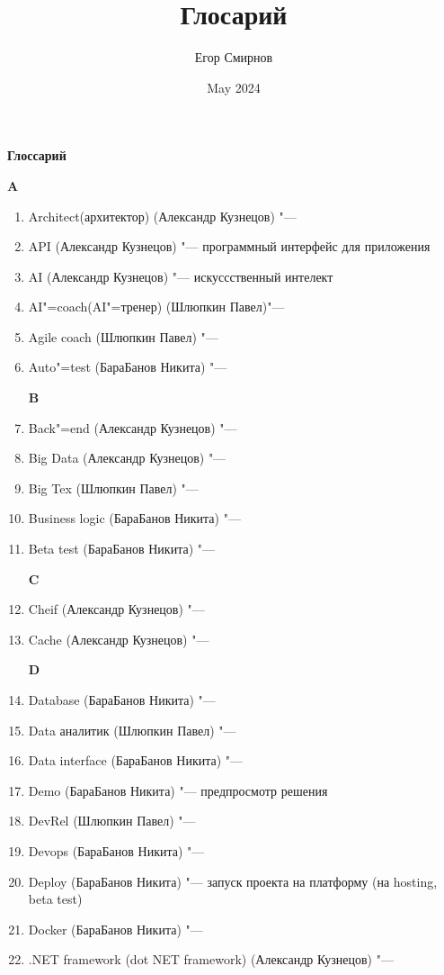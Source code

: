 \documentclass{article}
\title{Глосарий}
\author{Егор Смирнов}
\date{May 2024}
\begin{document}
\begin{center}
    \textbf{Глоссарий}
\end{center}
\hspace{0.065\textwidth}
\textbf{A} 
\begin{enumerate}
    \item {Architect(архитектор) (Александр Кузнецов) "---}
    \item {API (Александр Кузнецов) "--- программный интерфейс для приложения}
    \item {AI (Александр Кузнецов) "--- искуссственный интелект}
    \item {AI"=coach(AI"=тренер) (Шлюпкин Павел)"---}
    \item {Agile coach (Шлюпкин Павел) "---}
    \item {Auto"=test (БараБанов Никита) "---}
    
    \textbf{B}
    \item {Back"=end (Александр Кузнецов) "---} 
    \item {Big Data (Александр Кузнецов) "---}
    \item {Big Tex (Шлюпкин Павел) "---}
    \item {Business logic (БараБанов Никита) "---}
    \item {Beta test (БараБанов Никита) "---}
    
    
    \textbf{C}
    \item {Cheif (Александр Кузнецов) "---}
    \item {Cache (Александр Кузнецов) "---}
    
    \textbf{D}
    \item {Database (БараБанов Никита) "---}
    \item {Data аналитик (Шлюпкин Павел) "--- }
    \item {Data interface (БараБанов Никита) "---}
    \item {Demo (БараБанов Никита) "--- предпросмотр решения}
    \item {DevRel (Шлюпкин Павел) "---}
    \item {Devops (БараБанов Никита) "---}
    \item {Deploy (БараБанов Никита) "--- запуск проекта на платформу (на hosting, beta test)}
    \item {Docker (БараБанов Никита) "---}
    \item{.NET framework (dot NET framework) (Александр Кузнецов) "---}
    


\end{enumerate}
\end{document}

